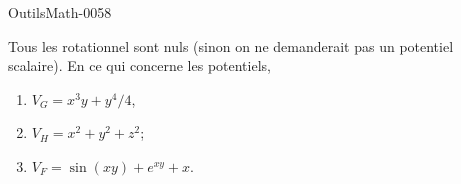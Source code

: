
\begin{corrige}{OutilsMath-0058}

    Tous les rotationnel sont nuls (sinon on ne demanderait pas un potentiel scalaire). En ce qui concerne les potentiels,
    \begin{enumerate}
        \item
            $V_G=x^3y+y^4/4$,
        \item
            $V_H=x^2+y^2+z^2$;
        \item
            $V_F=\sin(xy)+ e^{xy}+x$.
    \end{enumerate}

\end{corrige}

